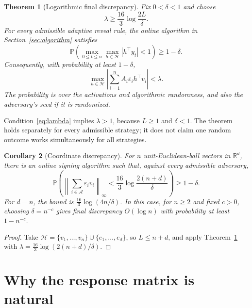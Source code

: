 \documentclass[11pt,a4paper]{article}
\numberwithin{equation}{section}
\newtheorem{theorem}{Theorem}[section]
\newtheorem{corollary}[theorem]{Corollary}
\theoremstyle{remark}
\newcommand{\R}{\mathbb R}
\newcommand{\Pp}{\mathbb P}
\newcommand{\HH}{\mathcal H}
\begin{document}
\begin{theorem}[Logarithmic final discrepancy]
\label{thm:main}
Fix $0<\delta<1$ and choose
\begin{equation}\label{eq:lambda}
 \lambda\ge\frac{16}{3}\log\frac{2L}{\delta}.
\end{equation}
For every admissible adaptive reveal rule, the online algorithm in
Section~\ref{sec:algorithm} satisfies
\begin{equation}\label{eq:uniform-y}
 \Pp\!\left(\max_{0\le t\le n}\max_{h\in\HH}|h^\top y_t|<1\right)
 \ge1-\delta.
\end{equation}
Consequently, with probability at least $1-\delta$,
\begin{equation}\label{eq:final-tests}
 \max_{h\in\HH}\left|\sum_{i=1}^n A_i\varepsilon_i h^\top v_i\right|
 <\lambda.
\end{equation}
The probability is over the activations and algorithmic randomness,
and also the adversary's seed if it is randomized.
\end{theorem}

Condition~\eqref{eq:lambda} implies $\lambda>1$, because $L\ge1$ and
$\delta<1$. The theorem holds separately for every admissible strategy;
it does not claim one random outcome works simultaneously for all
strategies.

\begin{corollary}[Coordinate discrepancy]
\label{cor:coordinates}
For $n$ unit-Euclidean-ball vectors in $\R^d$, there is an online signing
algorithm such that, against every admissible adversary,
\begin{equation}\label{eq:coordinate-bound}
 \Pp\!\left(
 \left\|\sum_{i\in\mathcal A}\varepsilon_i v_i\right\|_\infty
 <\frac{16}{3}\log\frac{2(n+d)}{\delta}\right)\ge1-\delta.
\end{equation}
For $d=n$, the bound is $\frac{16}{3}\log(4n/\delta)$. In this case,
for $n\ge2$ and fixed $c>0$, choosing $\delta=n^{-c}$ gives final
discrepancy $O(\log n)$ with probability at least $1-n^{-c}$.
\end{corollary}
\begin{proof}
Take $\HH=\{v_1,\ldots,v_n\}\cup\{e_1,\ldots,e_d\}$, so $L\le n+d$,
and apply Theorem~\ref{thm:main} with
$\lambda=\frac{16}{3}\log(2(n+d)/\delta)$.
\end{proof}

\section{Why the response matrix is natural}
\end{document}
